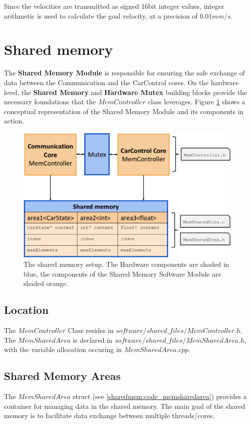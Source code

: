 Since the velocities are transmitted as signed 16bit integer values, integer arithmetic is used to calculate the goal velocity, at a precision of $0.01mm/s$.


\section{Shared memory}
The \textbf{Shared Memory Module} is responsible for ensuring the safe exchange of data between the Communication and the CarControl cores. On the hardware level, the \textbf{Shared Memory} and \textbf{Hardware Mutex} building blocks provide the necessary foundations that the \textbf{$MemController$} class leverages. Figure \ref{sharedmem:pic_overview} shows a conceptual representation of the Shared Memory Module and its components in action.

\begin{figure}[h]\label{sharedmem:pic_overview}
  \caption{The shared memory setup. The Hardware components are shaded in blue, the components of the Shared Memory Software Module are shaded orange.}
  \centering
    \includegraphics[width=1.0\textwidth]{figures/shared_memory.png}
\end{figure}

\subsection{Location}
The $MemController$ Class resides in $software/shared\_files/MemController.h$. The $MemSharedArea$ is declared in $software/shared\_files/MemSharedArea.h$, with the variable allocation occuring in $MemSharedArea.cpp$.

\subsection{Shared Memory Areas}
The \textbf{$MemSharedArea$} struct (see \ref{sharedmem:code_memsharedarea}) provides a container for managing data in the shared memory. The main goal of the shared memory is to facilitate data exchange between multiple threads/cores.

